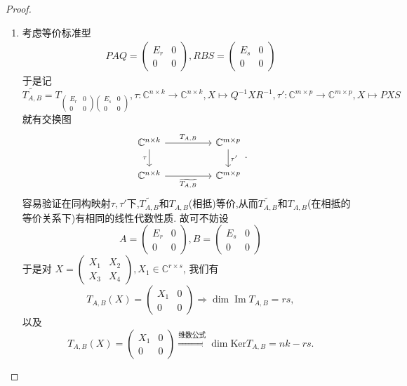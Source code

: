 \documentclass[../../main.tex]{subfiles}%
\begin{document}
\begin{proof}
\begin{enumerate}
\item 考虑等价标准型
\begin{align*}
PAQ = \begin{pmatrix} E_r & 0 \\ 0 & 0 \end{pmatrix}, RBS = \begin{pmatrix} E_s & 0 \\ 0 & 0 \end{pmatrix}
\end{align*}
于是记
$$\widetilde{T_{A,B}} = T_{\begin{pmatrix} E_r & 0 \\ 0 & 0 \end{pmatrix} \begin{pmatrix} E_s & 0 \\ 0 & 0 \end{pmatrix}}, \tau : \mathbb{C}^{n \times k} \to \mathbb{C}^{n \times k}, X \mapsto Q^{-1}XR^{-1}, \tau' : \mathbb{C}^{m \times p} \to \mathbb{C}^{m \times p}, X \mapsto PXS$$
就有交换图
\[
\begin{tikzcd}
\mathbb{C}^{n\times k} \arrow[rr, "{T_{A,B}}"] \arrow[d, "\tau"'] &  & \mathbb{C}^{m\times p} \arrow[d, "\tau'"] \\
\mathbb{C}^{n\times k} \arrow[rr, "{\widetilde{T_{A,B}}}"']       &  & \mathbb{C}^{m\times p}                   
\end{tikzcd}.
\]
容易验证在同构映射$\tau ,\tau'$下,$\widetilde{T_{A,B}}$和$T_{A,B}$(相抵)等价,从而$\widetilde{T_{A,B}}$和$T_{A,B}$(在相抵的等价关系下)有相同的线性代数性质.
故可不妨设
$$A = \begin{pmatrix} E_r & 0 \\ 0 & 0 \end{pmatrix}, B = \begin{pmatrix} E_s & 0 \\ 0 & 0 \end{pmatrix}$$
于是对 $X = \begin{pmatrix} X_1 & X_2 \\ X_3 & X_4 \end{pmatrix}, X_1 \in \mathbb{C}^{r \times s}$, 我们有
$$T_{A,B}(X) = \begin{pmatrix} X_1 & 0 \\ 0 & 0 \end{pmatrix} \Rightarrow \dim \operatorname{Im} T_{A,B} = rs,$$
以及
$$T_{A,B}(X) = \begin{pmatrix} X_1 & 0 \\ 0 & 0 \end{pmatrix} \stackrel{\text{维数公式}}{\Rightarrow} \dim \mathrm{Ker} T_{A,B} = nk - rs.$$


\end{enumerate}
\end{proof}
\end{document}
